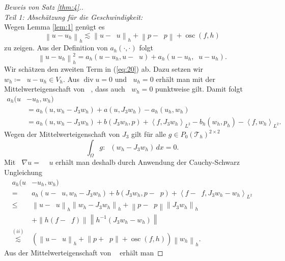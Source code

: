 \documentclass[a4paper]{scrartcl}
\newcommand{\J}[1]{J_{#1}}
\newcommand{\mesh}{\mathcal{T}_h}
\newcommand{\dx}{\,dx}
\newcommand{\norm}[1]{\left\lVert#1\right\rVert}
\newcommand{\hnorm}[1]{\left\lVert#1\right\rVert_h}
\newcommand{\scpr}[2]{\left\langle#1,#2\right\rangle_{L^2}}
\newcommand{\black}{\color{black}}
\DeclareMathOperator{\divOp}{div}
\DeclareMathOperator{\divh}{div_h}
\DeclareMathOperator{\nablah}{\nabla_{\textit{h}}}
\DeclareMathOperator{\intOp}{I_{NC}}
\DeclareMathOperator{\LtwoOp}{\Pi_0}
\DeclareMathOperator{\osc}{osc}
\theoremstyle{plain}
\theoremstyle{definition}
\theoremstyle{remark}
\begin{document}
\black
\begin{proof}[Beweis von Satz \ref{thm:4}.]
  \textit{\\Teil 1: Abschätzung für die Geschwindigkeit:}\\
  Wegen Lemma \ref{lem:1} genügt es
  \begin{equation}
    \label{eq:21}
    \hnorm{u - u_h} \lesssim \hnorm{u - \intOp u} + \norm{p - \LtwoOp p} + \osc(f, h)
  \end{equation}
  zu zeigen. Aus der Definition von \(a_h(\cdot,
  \cdot)\) folgt
  \begin{equation}
    \label{eq:20}
    \hnorm{u - u_h}^2 = a_h(u - u_h, u - \intOp u) + a_h(u - u_h, \intOp u - u_h). 
  \end{equation}
  Wir schätzen den zweiten Term in (\ref{eq:20}) ab. Dazu setzen wir \(w_h
  \coloneqq \intOp u - u_h \in V_h\). Aus \(\divOp u = 0\) und \(\divh
  u_h = 0\) erhält man mit der Mittelwerteigenschaft von \(\intOp\),
  dass auch \(\divh w_h = 0\) punktweise gilt. Damit folgt
  \begin{align}
    a_h(u &- u_h, w_h) \nonumber \\
    &= a_h(u,  w_h - \J3 w_h) + a(u, \J3 w_h) - a_h(u_h, w_h) \nonumber \\
    &= a_h(u,  w_h - \J3 w_h) + b(\J3 w_h, p) + \scpr{f}{\J3 w_h} \nonumber 
    - b_h(w_h, p_h) - \scpr{f}{w_h}. 
  \end{align}
  Wegen der Mittelwerteigenschaft von \(\J3\) gilt für alle \(g \in
  P_0(\mesh)^{2\times 2}\)
  \begin{equation}
    \label{eq:22}
    \int_\Omega g : \nablah (w_h - \J3 w_h) \dx = 0. 
  \end{equation}
  Mit \(\LtwoOp \nabla u = \nablah \intOp u\) erhält man deshalb durch
  Anwendung der Cauchy-Schwarz Ungleichung
  \begin{align} \label{al:1}
    a_h(u &- u_h, w_h) \nonumber \\
    =& a_h(u - \intOp u, w_h - \J3 w_h) + b(\J3 w_h, p - \LtwoOp p) + \scpr{f - \LtwoOp f}{\J3 w_h - w_h} \nonumber \\
    \leq& \hnorm{u - \intOp u}\hnorm{w_h - \J3 w_h} +\norm{p - \LtwoOp p}\hnorm{\J3 w_h} \nonumber \\
    & + \norm{h(f - \LtwoOp f)}\norm{h^{-1}(\J3 w_h - w_h)} \nonumber \\
    \overset{(ii)}{\lesssim}& \left(\hnorm{u - \intOp u} + \norm{p + \LtwoOp p} + \osc(f, h)\right) \hnorm{w_h}. 
  \end{align}
  Aus der Mittelwerteigenschaft von \(\intOp\) erhält man 

\end{proof}
\end{document}
